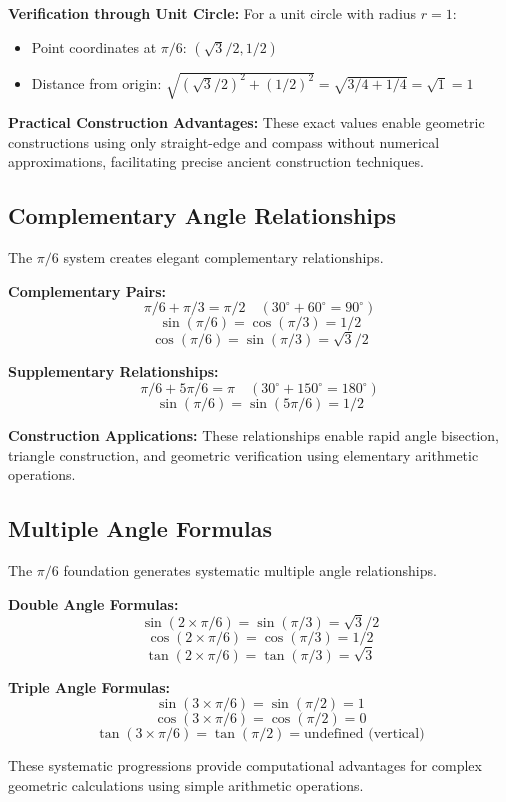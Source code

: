 \documentclass[11pt]{article}
\begin{document}
\textbf{Verification through Unit Circle:}
For a unit circle with radius $r = 1$:
\begin{itemize}
    \item Point coordinates at $\pi/6$: $(\sqrt{3}/2, 1/2)$
    \item Distance from origin: $\sqrt{(\sqrt{3}/2)^2 + (1/2)^2} = \sqrt{3/4 + 1/4} = \sqrt{1} = 1$ 
\end{itemize}

\textbf{Practical Construction Advantages:} These exact values enable geometric constructions using only straight-edge and compass without numerical approximations, facilitating precise ancient construction techniques.

\subsection{Complementary Angle Relationships}
The $\pi/6$ system creates elegant complementary relationships.

\textbf{Complementary Pairs:}
\[ \pi/6 + \pi/3 = \pi/2 \quad (30^\circ + 60^\circ = 90^\circ) \]
\[ \sin(\pi/6) = \cos(\pi/3) = 1/2 \]
\[ \cos(\pi/6) = \sin(\pi/3) = \sqrt{3}/2 \]

\textbf{Supplementary Relationships:}
\[ \pi/6 + 5\pi/6 = \pi \quad (30^\circ + 150^\circ = 180^\circ) \]
\[ \sin(\pi/6) = \sin(5\pi/6) = 1/2 \]

\textbf{Construction Applications:} These relationships enable rapid angle bisection, triangle construction, and geometric verification using elementary arithmetic operations.

\subsection{Multiple Angle Formulas}
The $\pi/6$ foundation generates systematic multiple angle relationships.

\textbf{Double Angle Formulas:}
\[ \sin(2 \times \pi/6) = \sin(\pi/3) = \sqrt{3}/2 \]
\[ \cos(2 \times \pi/6) = \cos(\pi/3) = 1/2 \]
\[ \tan(2 \times \pi/6) = \tan(\pi/3) = \sqrt{3} \]

\textbf{Triple Angle Formulas:}
\[ \sin(3 \times \pi/6) = \sin(\pi/2) = 1 \]
\[ \cos(3 \times \pi/6) = \cos(\pi/2) = 0 \]
\[ \tan(3 \times \pi/6) = \tan(\pi/2) = \text{undefined (vertical)} \]

These systematic progressions provide computational advantages for complex geometric calculations using simple arithmetic operations.
\end{document}
